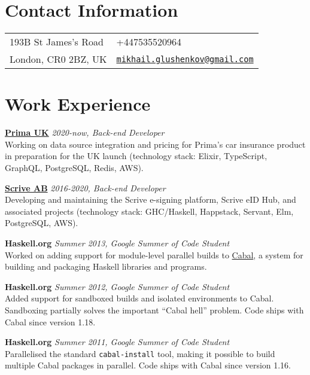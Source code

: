 \documentclass[margin,line]{res}
\begin{document}

\begin{resume}
\section{\sc Contact Information}
\vspace{.05in}
\begin{tabular}{@{}p{2in}p{4in}}
193B St James's Road&
+447535520964\\
London, CR0 2BZ, UK&
\href{mailto:mikhail.glushenkov@gmail.com}
{\texttt{mikhail.glushenkov@gmail.com}}\\
\end{tabular}

\section{\sc Work Experience}

{\bf \href{http://prima.it}{Prima UK}} \hfill {\it 2020-now, Back-end Developer}\\
Working on data source integration and pricing for Prima's car
insurance product in preparation for the UK launch (technology stack:
Elixir, TypeScript, GraphQL, PostgreSQL, Redis, AWS).

{\bf \href{http://scrive.com}{Scrive AB}} \hfill {\it 2016-2020, Back-end Developer}\\
Developing and maintaining the Scrive e-signing platform, Scrive eID
Hub, and associated projects (technology stack: GHC/Haskell,
Happstack, Servant, Elm, PostgreSQL, AWS).

{\bf Haskell.org} \hfill {\it Summer 2013, Google Summer of Code Student}\\
Worked on adding support for module-level parallel builds to
\href{http://haskell.org/cabal}{Cabal}, a system for building and
packaging Haskell libraries and programs.

{\bf Haskell.org} \hfill {\it Summer 2012, Google Summer of Code Student}\\
Added support for sandboxed builds and isolated environments to
Cabal. Sandboxing partially solves the important ``Cabal hell'' problem. Code
ships with Cabal since version 1.18.

{\bf Haskell.org} \hfill {\it Summer 2011, Google Summer of Code Student}\\
Parallelised the standard \texttt{cabal-install} tool, making it possible to
build multiple Cabal packages in parallel. Code ships with Cabal since version
1.16.


\end{resume}
\end{document}
